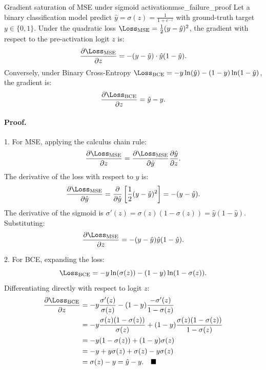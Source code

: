 \documentclass[../../main.tex]{subfiles}
\begin{document}
\begin{theorem}{Gradient saturation of MSE under sigmoid activation}{mse_failure_proof}
Let a binary classification model predict $\hat{y} = \sigma(z) = \frac{1}{1 + e^{-z}}$ with ground-truth target $y \in \{0, 1\}$. Under the quadratic loss $\Loss_{\text{MSE}} = \frac{1}{2}(y - \hat{y})^2$, the gradient with respect to the pre-activation logit $z$ is:
\begin{equation}
\label{eq:mse_gradient_sat}
\frac{\partial \Loss_{\text{MSE}}}{\partial z} = - (y - \hat{y}) \cdot \hat{y}(1 - \hat{y}).
\end{equation}
Conversely, under Binary Cross-Entropy $\Loss_{\text{BCE}} = - y \ln(\hat{y}) - (1 - y) \ln(1 - \hat{y})$, the gradient is:
\begin{equation}
\label{eq:bce_gradient_clean}
\frac{\partial \Loss_{\text{BCE}}}{\partial z} = \hat{y} - y.
\end{equation}
\end{theorem}

\paragraph{Proof.}
1. For MSE, applying the calculus chain rule:
\begin{equation}
\frac{\partial \Loss_{\text{MSE}}}{\partial z} = \frac{\partial \Loss_{\text{MSE}}}{\partial \hat{y}} \frac{\partial \hat{y}}{\partial z}.
\end{equation}
The derivative of the loss with respect to $\hat{y}$ is:
\[
\frac{\partial \Loss_{\text{MSE}}}{\partial \hat{y}} = \frac{\partial}{\partial \hat{y}} \left[ \frac{1}{2}(y - \hat{y})^2 \right] = -(y - \hat{y}).
\]
The derivative of the sigmoid is $\sigma'(z) = \sigma(z)(1 - \sigma(z)) = \hat{y}(1 - \hat{y})$. Substituting:
\begin{equation}
\frac{\partial \Loss_{\text{MSE}}}{\partial z} = -(y - \hat{y}) \hat{y}(1 - \hat{y}). \label{eq:mse_grad_derived}
\end{equation}

2. For BCE, expanding the loss:
\begin{equation}
\Loss_{\text{BCE}} = - y \ln(\sigma(z)) - (1 - y) \ln(1 - \sigma(z)).
\end{equation}
Differentiating directly with respect to logit $z$:
\begin{align*}
\frac{\partial \Loss_{\text{BCE}}}{\partial z} &= - y \frac{\sigma'(z)}{\sigma(z)} - (1 - y) \frac{-\sigma'(z)}{1 - \sigma(z)} \\
&= - y \frac{\sigma(z)(1 - \sigma(z))}{\sigma(z)} + (1 - y) \frac{\sigma(z)(1 - \sigma(z))}{1 - \sigma(z)} \\
&= - y (1 - \sigma(z)) + (1 - y) \sigma(z) \\
&= - y + y \sigma(z) + \sigma(z) - y \sigma(z) \\
&= \sigma(z) - y = \hat{y} - y. \quad \blacksquare
\end{align*}
\end{document}
